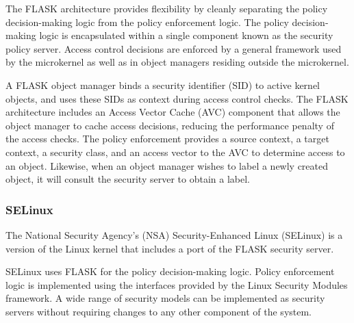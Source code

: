 The FLASK architecture provides flexibility by cleanly separating
the policy decision-making logic from the policy enforcement logic.
The policy decision-making logic is encapsulated within a single
component known as the security policy server.  Access control
decisions are enforced by a general framework used by the microkernel
as well as in object managers residing outside the microkernel.

A FLASK object manager binds a security identifier (SID) to active
kernel objects, and uses these SIDs as context during access control
checks.  The FLASK architecture includes an Access Vector Cache
(AVC) component that allows the object manager to cache access
decisions, reducing the performance penalty of the access checks.
The policy enforcement provides a source context, a target context,
a security class, and an access vector to the AVC to determine
access to an object.  Likewise, when an object manager wishes to
label a newly created object, it will consult the security server
to obtain a label.

\subsubsection{SELinux}

The National Security Agency's (NSA) Security-Enhanced
Linux\cite{loscocco01} (SELinux) is a version of the Linux
kernel that includes a port of the FLASK security server.

SELinux uses FLASK for the policy decision-making logic.  Policy
enforcement logic is implemented using the interfaces provided by
the Linux Security Modules framework\cite{loscocco01}.  A
wide range of security models can be implemented as security servers
without requiring changes to any other component of the system.
